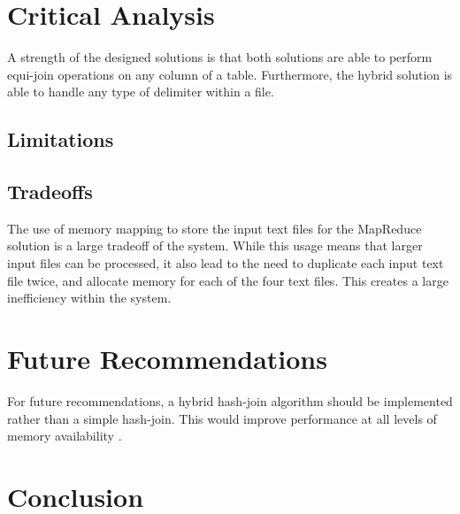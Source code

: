 \documentclass[10pt,twocolumn]{witseiepaper}
\begin{document}
\section{Critical Analysis}
A strength of the designed solutions is that both solutions are able to perform equi-join operations on any column of a table. Furthermore, the hybrid solution is able to handle any type of delimiter within a file.

\subsection{Limitations}

\subsection{Tradeoffs} \label{sec:tradeoffs}
The use of memory mapping to store the input text files for the MapReduce solution is a large tradeoff of the system. While this usage means that larger input files can be processed, it also lead to the need to duplicate each input text file twice, and allocate memory for each of the four text files. This creates a large inefficiency within the system.

\section{Future Recommendations}
For future recommendations, a hybrid hash-join algorithm should be implemented rather than a simple hash-join. This would improve performance at all levels of memory availability \cite{evaluating4JoinAlgorithms}.

\section{Conclusion}



\end{document}
